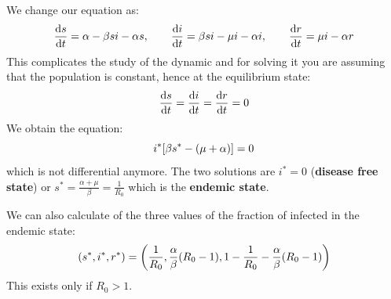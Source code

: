 \documentclass[../main/main.tex]{subfiles}
\begin{document}
We change our equation as:
\begin{equation*}
  \dv{s}{t} = \alpha - \beta s i - \alpha s, \qquad \dv{i}{t} = \beta s i - \mu i - \alpha i, \qquad \dv{r}{t} = \mu i - \alpha r
\end{equation*}
This complicates the study of the dynamic and for solving it you are assuming that the population is constant, hence at the equilibrium state:
\begin{equation*}
  \dv{s}{t} = \dv{i}{t} = \dv{r}{t} = 0
\end{equation*}
We obtain the equation:
\begin{equation*}
  i^* \qty[\beta s^* - (\mu + \alpha )] = 0
\end{equation*}
which is not differential anymore. The two solutions are \( i^* = 0 \) (\textbf{disease free state}) or \( s^* = \frac{\alpha + \mu }{\beta } = \frac{1}{R_0} \) which is the \textbf{endemic state}.

We can also calculate of the three values of the fraction of infected in the endemic state:
\begin{equation*}
  (s^*, i^*, r^*) = \qty( \frac{1}{R_0}, \frac{\alpha }{\beta } (R_0 -1 ), 1- \frac{1}{R_0} - \frac{\alpha }{\beta } (R_0-1))
\end{equation*}
This exists only if \( R_0>1 \).
\end{document}
